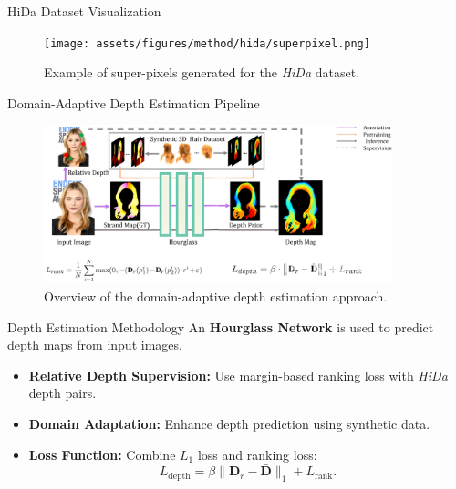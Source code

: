\begin{frame}{HiDa Dataset Visualization}
    \begin{figure}[h]
        \centering
        \texttt{[image: assets/figures/method/hida/superpixel.png]}
        \caption{Example of super-pixels generated for the \emph{HiDa} dataset.}
        \label{fig:hida-superpixel}
    \end{figure}
\end{frame}

\begin{frame}{Domain-Adaptive Depth Estimation Pipeline}
    \begin{figure}[h]
        \centering
        \includegraphics[width=0.9\textwidth]{assets/figures/method/depth/pipeline.png}
        \caption{Overview of the domain-adaptive depth estimation approach.}
        \label{fig:depth_estimation_overview}
    \end{figure}
\end{frame}

\begin{frame}[t]{Depth Estimation Methodology}
    An \textbf{Hourglass Network} is used to predict depth maps from input images.
    \vspace{5pt}
    \begin{itemize}
        \item \textbf{Relative Depth Supervision:} Use margin-based ranking loss with \emph{HiDa} depth pairs.
        \item \textbf{Domain Adaptation:} Enhance depth prediction using synthetic data.
        \item \textbf{Loss Function:} Combine $L_1$ loss and ranking loss:
        \begin{equation}
            L_{\text{depth}} = \beta \|\mathbf{D}_r - \bar{\mathbf{D}}\|_1 + L_{\text{rank}}.
        \end{equation}  
    \end{itemize}

\end{frame}

